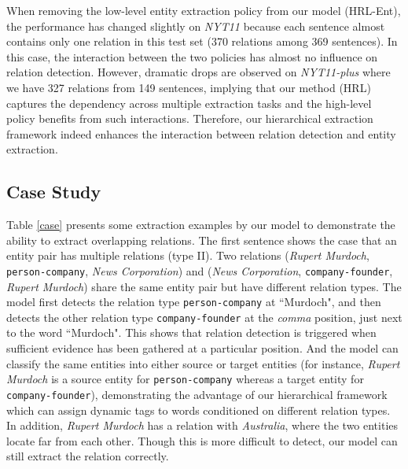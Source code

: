 \documentclass[letterpaper]{article} %
\theoremstyle{definition}
\begin{document}
When removing the low-level entity extraction policy from our model (HRL-Ent), the performance has changed slightly on \textit{NYT11} because each sentence almost contains only one relation in this test set (370 relations among 369 sentences).
In this case, the interaction between the two policies has almost no influence on relation detection. However, dramatic drops are observed on \textit{NYT11-plus} where we have 327 relations from 149 sentences, implying that our method (HRL) captures the dependency across multiple extraction tasks and the high-level policy benefits from such interactions. Therefore, our hierarchical extraction framework indeed enhances the interaction between relation detection and entity extraction.

\subsection{Case Study}


Table \ref{case} presents some extraction examples by our model to demonstrate the ability to extract overlapping relations. The first sentence shows the case that an entity pair has multiple relations (type II). Two relations (\textit{Rupert Murdoch}, \texttt{person-company}, \textit{News Corporation}) and (\textit{News Corporation}, \texttt{company-founder}, \textit{Rupert Murdoch}) share the same entity pair but have different relation types. The model first detects the relation type \texttt{person-company} at ``Murdoch", and then detects the other relation type \texttt{company-founder} at the \textit{comma} position, just next to the word ``Murdoch". This shows that relation detection is triggered when sufficient evidence has been gathered at a particular position.
And the model can classify the same entities into either source or target entities (for instance, \textit{Rupert Murdoch} is a source entity for \texttt{person-company} whereas a target entity for \texttt{company-founder}), demonstrating the advantage of our hierarchical framework which can assign dynamic tags to words conditioned on different relation types.
In addition, \textit{Rupert Murdoch} has a relation with \textit{Australia}, where the two entities locate far from each other. Though this is more difficult to detect, our model can still extract the relation correctly.
\end{document}
